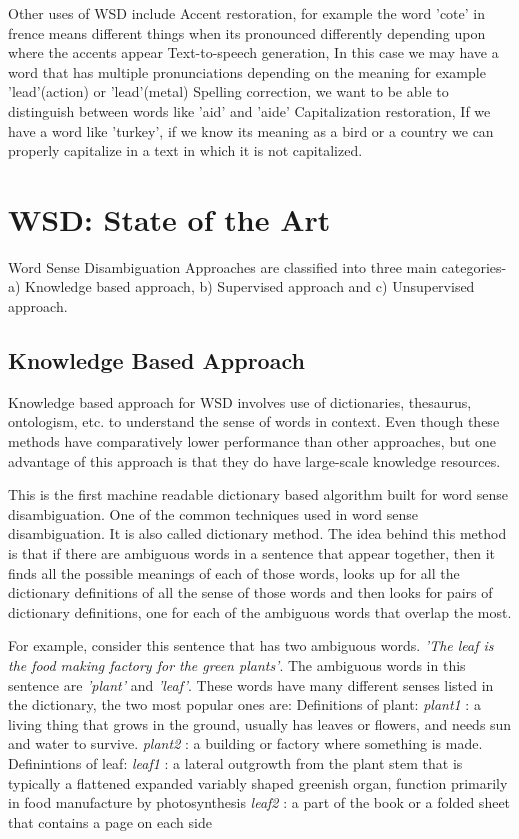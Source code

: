 \documentclass[article,dr=phil,type=drfinal,colorback,accentcolor=tud9c]{tudthesis}
\begin{document}
Other uses of WSD include
Accent restoration, for example the word 'cote' in frence means different things when its pronounced differently depending upon where the accents appear
Text-to-speech generation, In this case we may have a word that has multiple pronunciations depending on the meaning for example 'lead'(action) or 'lead'(metal)
Spelling correction, we want to be able to distinguish between words like 'aid' and 'aide'
Capitalization restoration, If we have a word like 'turkey', if we know its meaning as a bird or a country we can properly capitalize in a text in which it is not capitalized.

\newpage
\section{WSD: State of the Art}
Word Sense Disambiguation Approaches are classified into three main categories- a) Knowledge based approach, b) Supervised approach and c) Unsupervised approach.

\subsection{Knowledge Based Approach}
Knowledge based approach for WSD involves use of dictionaries,
thesaurus, ontologism, etc. to understand the sense of words in context. Even
though these methods have comparatively lower performance than other
approaches, but one advantage of this approach is that they do have large-scale
knowledge resources.

This is the first machine readable dictionary based algorithm built for word sense disambiguation.  One of the common techniques used in word sense disambiguation. It is also called dictionary method. The idea behind this method is that if there are ambiguous words in a sentence that appear together, then it finds all the possible meanings of each of those words, looks up for all the dictionary definitions of all the sense of those words and then looks for pairs of dictionary definitions, one for each of the ambiguous words that overlap the most.

For example, consider this sentence that has two ambiguous words. \textit{'The leaf is the food making factory for the green plants'}. The ambiguous words in this sentence are \textit{'plant'} and \textit{'leaf'}. These words have many different senses listed in the dictionary, the two most popular ones are:
Definitions of plant:
\textit{plant1} : a living thing that grows in the ground, usually has leaves or flowers, and needs sun and water to survive.
\textit{plant2} : a building or factory where something is made.
Definintions of leaf:
\textit{leaf1} : a lateral outgrowth from the plant stem that is typically a flattened expanded variably shaped greenish organ, function primarily in food manufacture by photosynthesis
\textit{leaf2} : a part of the book or a folded sheet that contains a page on each side
\end{document}

